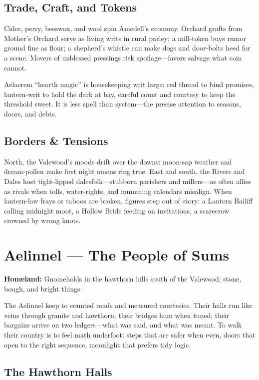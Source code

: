 \documentclass[11pt,letterpaper]{article}
\begin{document}
\subsection*{Trade, Craft, and Tokens}

Cider, perry, beeswax, and wool spin Amedell's economy. Orchard grafts from Mother's Orchard serve as living writs in rural parley; a mill-token buys rumor ground fine as flour; a shepherd's whistle can make dogs and door-bolts heed for a scene. Movers of unblessed pressings risk spoilage---favors salvage what coin cannot.

Aelaerem ``hearth magic'' is housekeeping writ large: red thread to bind promises, lantern-writ to hold the dark at bay, careful count and courtesy to keep the threshold sweet. It is less spell than system---the precise attention to seasons, doors, and debts.

\subsection*{Borders \& Tensions}

North, the Valewood's moods drift over the downs: moon-sap weather and dream-pollen make first night omens ring true. East and south, the Rivers and Dales host tight-lipped dalesfolk---stubborn parishers and millers---as often allies as rivals when tolls, water-rights, and mumming calendars misalign. When lantern-law frays or taboos are broken, figures step out of story: a Lantern Bailiff calling midnight moot, a Hollow Bride feeding on invitations, a scarecrow crowned by wrong knots.


\section{Aelinnel --- The People of Sums}

\textbf{Homeland:} Gnomeholds in the hawthorn hills south of the Valewood; stone, bough, and bright things.

The Aelinnel keep to counted roads and measured courtesies. Their halls run like veins through granite and hawthorn; their bridges hum when tuned; their bargains arrive on two ledgers---what was said, and what was meant. To walk their country is to feel math underfoot: steps that are safer when even, doors that open to the right sequence, moonlight that prefers tidy logic.

\subsection*{The Hawthorn Halls}
\end{document}
